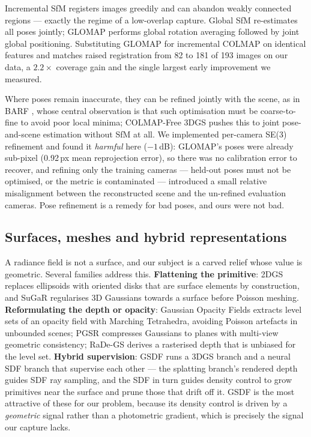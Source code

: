 Incremental SfM \cite{schoenberger2016sfm} registers images greedily and can
abandon weakly connected regions — exactly the regime of a low-overlap capture.
Global SfM re-estimates all poses jointly; GLOMAP \cite{pan2024glomap} performs
global rotation averaging followed by joint global positioning. Substituting
GLOMAP for incremental COLMAP on identical features and matches raised
registration from 82 to 181 of 193 images on our data, a $2.2\times$ coverage gain
and the single largest early improvement we measured.

Where poses remain inaccurate, they can be refined jointly with the scene, as in
BARF \cite{lin2021barf}, whose central observation is that such optimisation must
be coarse-to-fine to avoid poor local minima; COLMAP-Free 3DGS
\cite{fu2024colmapfree} pushes this to joint pose-and-scene estimation without SfM
at all. We implemented per-camera SE(3) refinement and found it \emph{harmful}
here ($-1$\,dB): GLOMAP's poses were already sub-pixel (0.92\,px mean reprojection
error), so there was no calibration error to recover, and refining only the
training cameras — held-out poses must not be optimised, or the metric is
contaminated — introduced a small relative misalignment between the reconstructed
scene and the un-refined evaluation cameras. Pose refinement is a remedy for bad
poses, and ours were not bad.

\subsection{Surfaces, meshes and hybrid representations}

A radiance field is not a surface, and our subject is a carved relief whose value
is geometric. Several families address this. \textbf{Flattening the primitive}:
2DGS \cite{huang20242dgs} replaces ellipsoids with oriented disks that are surface
elements by construction, and SuGaR \cite{guedon2024sugar} regularises 3D Gaussians
towards a surface before Poisson meshing. \textbf{Reformulating the depth or
opacity}: Gaussian Opacity Fields \cite{yu2024gof} extracts level sets of an
opacity field with Marching Tetrahedra, avoiding Poisson artefacts in unbounded
scenes; PGSR \cite{chen2024pgsr} compresses Gaussians to planes with multi-view
geometric consistency; RaDe-GS \cite{zhang2024radegs} derives a rasterised depth
that is unbiased for the level set. \textbf{Hybrid supervision}: GSDF
\cite{yu2024gsdf} runs a 3DGS branch and a neural SDF branch that supervise each
other — the splatting branch's rendered depth guides SDF ray sampling, and the SDF
in turn guides density control to grow primitives near the surface and prune those
that drift off it. GSDF is the most attractive of these for our problem, because
its density control is driven by a \emph{geometric} signal rather than a
photometric gradient, which is precisely the signal our capture lacks.


